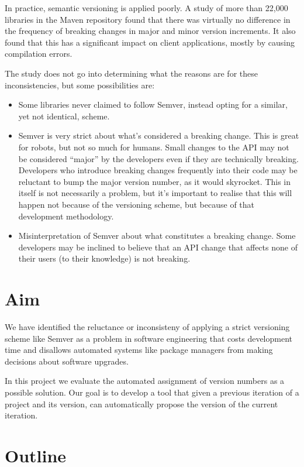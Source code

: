 \documentclass{l4proj}
\begin{document}
In practice, semantic versioning is applied poorly. A
study\cite{SemverMaven} of more than 22,000 libraries in the Maven
repository found that there was virtually no difference in the
frequency of breaking changes in major and minor version increments.
It also found that this has a significant impact on client
applications, mostly by causing compilation errors.

The study does not go into determining what the reasons are for these
inconsistencies, but some possibilities are:
\begin{itemize}
\item Some libraries never claimed to follow Semver, instead opting
for a similar, yet not identical, scheme.
\item Semver is very strict about what's considered a breaking change.
This is great for robots, but not so much for humans. Small changes to
the API may not be considered ``major'' by the developers even if they
are technically breaking. Developers who introduce breaking changes
frequently into their code may be reluctant to bump the major version
number, as it would skyrocket. This in itself is not necessarily a
problem, but it's important to realise that this will happen not
because of the versioning scheme, but because of that development
methodology.
\item Misinterpretation of Semver about what constitutes a breaking
change. Some developers may be inclined to believe that an API change
that affects none of their users (to their knowledge) is not breaking.
\end{itemize}

\section{Aim}

We have identified the reluctance or inconsisteny of applying a strict
versioning scheme like Semver as a problem in software engineering
that costs development time and disallows automated systems like
package managers from making decisions about software upgrades.

In this project we evaluate the automated assignment of version
numbers as a possible solution. Our goal is to develop a tool that
given a previous iteration of a project and its version, can
automatically propose the version of the current iteration.

\clearpage
\section{Outline}
\end{document}
